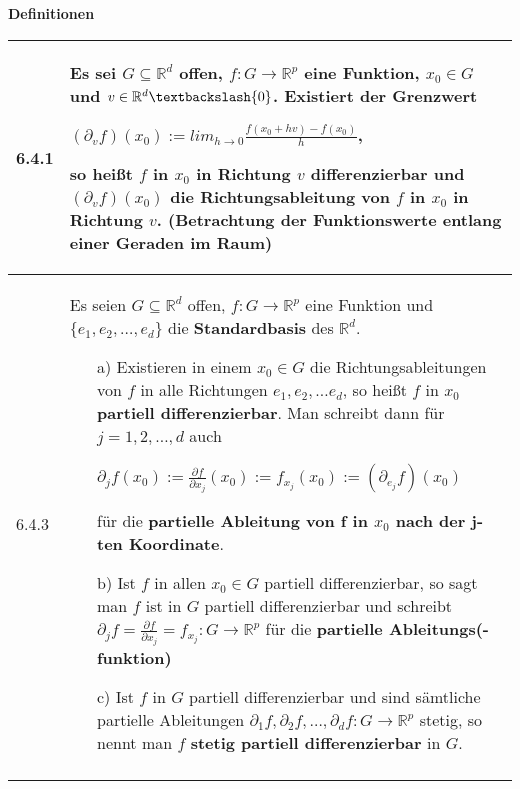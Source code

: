     \noindent
    \textbf{Definitionen}
    \begin{table}[H]  
    \begin{tabularx}{\textwidth}{X m{16cm}}
        \toprule

        6.4.1 & Es sei $G \subseteq \mathbb{R}^d$ offen, $f: G \rightarrow \mathbb{R}^p$ eine Funktion, $x_0 \in G$ und $v \in \mathbb{R}^d 
                \textbackslash \{0\}$. Existiert der Grenzwert \hfill \break
                \centerline{$ (\partial_v f) (x_0) := lim_{h \rightarrow 0} \frac{f(x_0 +hv) - f(x_0)}{h}$,}
                so heißt $f$ in $x_0$ in Richtung $v$ differenzierbar und $(\partial_v f)(x_0)$ die \textbf{Richtungsableitung}
                von $f$ in $x_0$ in Richtung $v$. (Betrachtung der Funktionswerte entlang einer Geraden im Raum) \\
        \midrule
        6.4.3 & Es seien $G \subseteq \mathbb{R}^d$ offen, $f: G \rightarrow \mathbb{R}^p$ eine Funktion und $\{ e_1,e_2,\dots,e_d \}$ die
                \textbf{Standardbasis} des $\mathbb{R}^d$.
                \begin{itemize}[topsep=-0.5cm]
                    \item[a)] Existieren in einem $x_0 \in G$ die Richtungsableitungen von $f$ in alle Richtungen $e_1, e_2, \dots e_d$, so heißt
                                $f$ in $x_0$ \textbf{partiell differenzierbar}. Man schreibt dann für $j =1,2,\dots,d$ auch \hfill \break
                                \centerline{$ \partial_j f(x_0) := \frac{\partial f}{\partial x_j} (x_0) := f_{x_j}(x_0) := (\partial_{e_j}f) (x_0)$}
                                für die \textbf{partielle Ableitung von f in $x_0$ nach der j-ten Koordinate}.
                    \item[b)] Ist $f$ in allen $x_0 \in G$ partiell differenzierbar, so sagt man $f$ ist in $G$ partiell differenzierbar und schreibt
                                $\partial_j f = \frac{\partial f}{\partial x_j} = f_{x_j} : G \rightarrow \mathbb{R}^p$ für die \textbf{partielle
                                Ableitungs(-funktion)}
                    \item[c)] Ist $f$ in $G$ partiell differenzierbar und sind sämtliche partielle Ableitungen $\partial_1 f, \partial_2 f, \dots,
                                \partial_d f: G \rightarrow \mathbb{R}^p$ stetig, so nennt man $f$ \textbf{stetig partiell differenzierbar} in $G$.
                \end{itemize} \vspace{-0cm} \\  \\

\end{tabularx}
\end{table}
